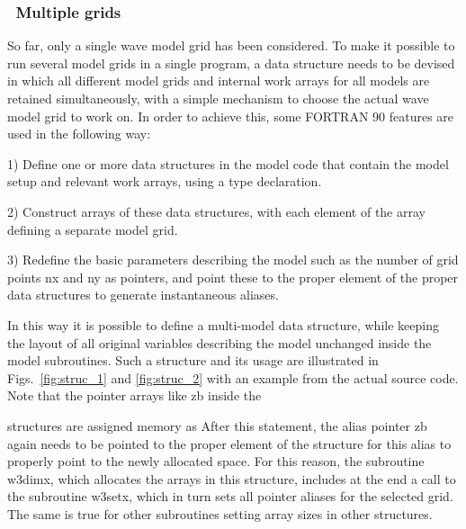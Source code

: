 \vsssub
\subsubsection{~Multiple grids} \label{sec:mgrids}
\vsssub

So far, only a single wave model grid has been considered.  To make it
possible to run several model grids in a single program, a data structure
needs to be devised in which all different model grids and internal work
arrays for all models are retained simultaneously, with a simple mechanism to
choose the actual wave model grid to work on. In order to achieve this, some
FORTRAN 90 features \citep[e.g.,][]{bk:MR99} are used in the following way:

\begin{list}{}{\rightmargin 8mm \leftmargin 10mm }

\item [1)] Define one or more data structures in the model code that contain
           the model setup and relevant work arrays, using a {\F type}
           declaration.

\item [2)] Construct arrays of these data structures, with each element of the
           array defining a separate model grid.

\item [3)] Redefine the basic parameters describing the model such as the
           number of grid points {\F nx} and {\F ny} as pointers, and point
           these to the proper element of the proper data structures to
           generate instantaneous aliases.

\end{list}

\noindent
In this way it is possible to define a multi-model data structure, while
keeping the layout of all original variables describing the model unchanged
inside the model subroutines.  Such a structure and its usage are illustrated
in Figs.~\ref{fig:struc_1} and \ref{fig:struc_2} with an example from the
actual source code. Note that the pointer arrays like {\F zb} inside the

structures are assigned memory as 
After this statement, the alias pointer {\F zb} again needs to be pointed to
the proper element of the structure for this alias to properly point to the
newly allocated space. For this reason, the subroutine {\F w3dimx}, which
allocates the arrays in this structure, includes at the end a call to the
subroutine {\F w3setx}, which in turn sets all pointer aliases for the
selected grid. The same is true for other subroutines setting array sizes in
other structures.

